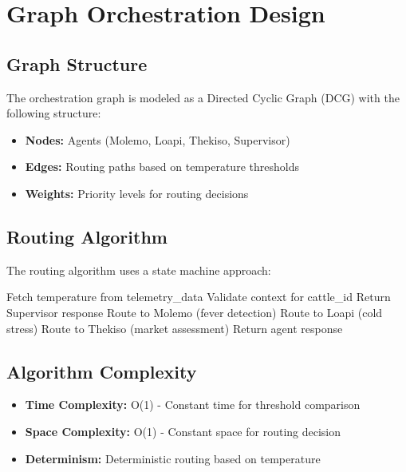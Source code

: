\section{Graph Orchestration Design}

\subsection{Graph Structure}

The orchestration graph is modeled as a Directed Cyclic Graph (DCG) with the following structure:

\begin{itemize}
    \item \textbf{Nodes:} Agents (Molemo, Loapi, Thekiso, Supervisor)
    \item \textbf{Edges:} Routing paths based on temperature thresholds
    \item \textbf{Weights:} Priority levels for routing decisions
\end{itemize}

\subsection{Routing Algorithm}

The routing algorithm uses a state machine approach:

\begin{algorithm}
\caption{Telemetry Routing Algorithm}
\begin{algorithmic}[1]
\State Fetch temperature from telemetry\_data
\State Validate context for cattle\_id
    \State Return Supervisor response
\EndIf
{}
    \State Route to Molemo (fever detection)
    \State Route to Loapi (cold stress)
\Else
    \State Route to Thekiso (market assessment)
\EndIf
\State Return agent response
\end{algorithmic}
\end{algorithm}

\subsection{Algorithm Complexity}

\begin{itemize}
    \item \textbf{Time Complexity:} O(1) - Constant time for threshold comparison
    \item \textbf{Space Complexity:} O(1) - Constant space for routing decision
    \item \textbf{Determinism:} Deterministic routing based on temperature
\end{itemize}

